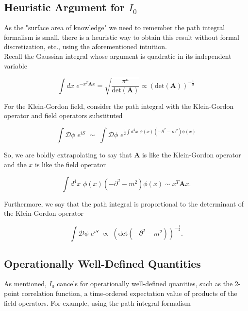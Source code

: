\subsection*{Heuristic Argument for $I_0$}

\noindent As the "surface area of knowledge" we need to remember the path integral formalism is small, there is a heuristic way to obtain this result without formal discretization, etc., using the aforementioned intuition. \\

\noindent Recall the Gaussian integral whose argument is quadratic in its independent variable

\begin{equation}
\int dx \,\, e^{-x^T \textbf{A} x} = \sqrt{\frac{\pi^n}{\text{det}(\textbf{A})}} \propto (\text{det}(\textbf{A}))^{-\frac{1}{2}}
\end{equation}

\noindent For the Klein-Gordon field, consider the path integral with the Klein-Gordon operator and field operators substituted

\begin{equation}
\int \mathcal{D} \phi \,\, e^{i S} \,\, \sim  \,\, \int \mathcal{D} \phi \,\, e^{\frac{1}{2} \int d^4 x \,\, \phi(x) (-\partial^2 - m^2) \phi (x)}
\end{equation}

\noindent So, we are boldly extrapolating to say that $\textbf{A}$ is like the Klein-Gordon operator and the $x$ is like the field operator

\begin{equation}
\int d^4 x \,\, \phi (x) (-\partial^2 - m^2) \phi (x) \sim x^T \textbf{A} x.
\end{equation}

\noindent Furthermore, we say that the path integral is proportional to the determinant of the Klein-Gordon operator

\begin{equation}
\int \mathcal{D} \phi \,\, e^{i S} \,\, \propto \,\, (\text{det}(-\partial^2 - m^2))^{-\frac{1}{2}}.
\end{equation}

\subsection*{Operationally Well-Defined Quantities}

\noindent As mentioned, $I_0$ cancels for operationally well-defined quanities, such as the 2-point correlation function, a time-ordered expectation value of products of the field operators. For example, using the path integral formalism


